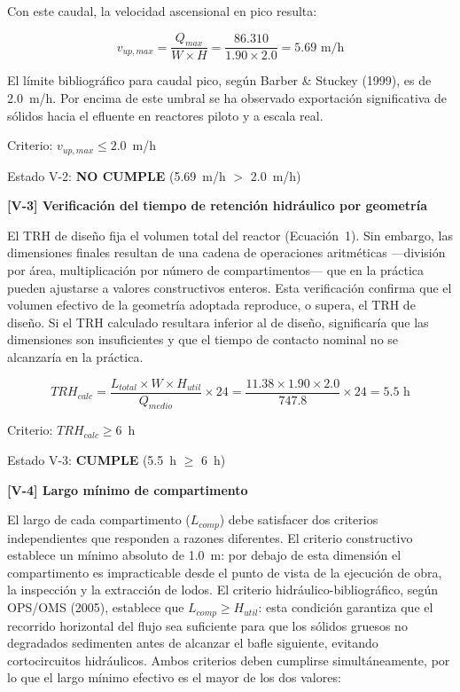 \documentclass[12pt,a4paper]{article}
\begin{document}
Con este caudal, la velocidad ascensional en pico resulta:

\begin{equation}
v_{up,max} = \frac{Q_{max}}{W \times H} = \frac{86.310}{1.90 \times 2.0} = 5.69 \text{ m/h}
\end{equation}

El límite bibliográfico para caudal pico, según Barber \& Stuckey (1999), es de 2.0~m/h. Por encima de este umbral se ha observado exportación significativa de sólidos hacia el efluente en reactores piloto y a escala real.

Criterio: $v_{up,max} \leq 2.0$~m/h

Estado V-2: \textbf{NO CUMPLE} (5.69~m/h $>$ 2.0~m/h)

\textbf{[V-3] Verificación del tiempo de retención hidráulico por geometría}

El TRH de diseño fija el volumen total del reactor (Ecuación~1). Sin embargo, las dimensiones finales resultan de una cadena de operaciones aritméticas ---división por área, multiplicación por número de compartimentos--- que en la práctica pueden ajustarse a valores constructivos enteros. Esta verificación confirma que el volumen efectivo de la geometría adoptada reproduce, o supera, el TRH de diseño. Si el TRH calculado resultara inferior al de diseño, significaría que las dimensiones son insuficientes y que el tiempo de contacto nominal no se alcanzaría en la práctica.

\begin{equation}
TRH_{calc} = \frac{L_{total} \times W \times H_{util}}{Q_{medio}} \times 24 = \frac{11.38 \times 1.90 \times 2.0}{747.8} \times 24 = 5.5 \text{ h}
\end{equation}

Criterio: $TRH_{calc} \geq 6$~h

Estado V-3: \textbf{CUMPLE} (5.5~h $\geq$ 6~h)

\textbf{[V-4] Largo mínimo de compartimento}

El largo de cada compartimento ($L_{comp}$) debe satisfacer dos criterios independientes que responden a razones diferentes. El criterio constructivo establece un mínimo absoluto de 1.0~m: por debajo de esta dimensión el compartimento es impracticable desde el punto de vista de la ejecución de obra, la inspección y la extracción de lodos. El criterio hidráulico-bibliográfico, según OPS/OMS (2005), establece que $L_{comp} \geq H_{util}$: esta condición garantiza que el recorrido horizontal del flujo sea suficiente para que los sólidos gruesos no degradados sedimenten antes de alcanzar el bafle siguiente, evitando cortocircuitos hidráulicos. Ambos criterios deben cumplirse simultáneamente, por lo que el largo mínimo efectivo es el mayor de los dos valores:
\end{document}
